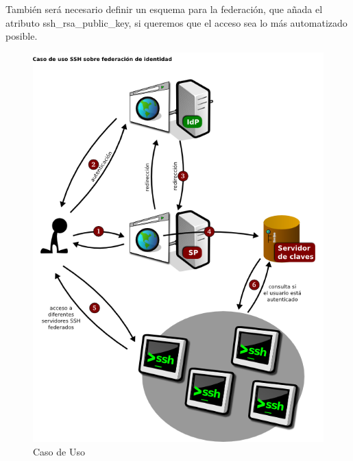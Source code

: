\begin{itemize}
    También será necesario definir un esquema para la federación, que añada
    el atributo ssh\_rsa\_public\_key, si queremos que el acceso sea lo más
    automatizado posible.




    \end{itemize}

    \begin{figure}[htp!]
        \centering
            \includegraphics[width=\textwidth]{img/casodeuso1.png}
            \caption{Caso de Uso}
        \label{fig:casodeuso}
    \end{figure}

